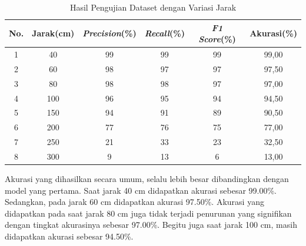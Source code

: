 
\begin{longtable}{|c|c|c|c|c|c|}
  \caption{Hasil Pengujian Dataset dengan Variasi Jarak}
  \label{tb:Hasil Pengujian Dataset dengan Variasi Jarak}\\
  \hline
  \textbf{No.} & \textbf{Jarak(cm)} & \textbf{\emph{Precision}(\%)} & \textbf{\emph{Recall}(\%)} & \textbf{\emph{F1 Score}(\%)} & \textbf{Akurasi(\%)} \\
  \hline
  1 & 40  & 99 & 99 & 99 & 99,00  \\
  2 & 60  & 98 & 97 & 97 & 97,50  \\
  3 & 80  & 98 & 98 & 97 & 97,00  \\
  4 & 100 & 96 & 95 & 94 & 94,50  \\
  5 & 150 & 94 & 91 & 89 & 90,50  \\
  6 & 200 & 77 & 76 & 75 & 77,00  \\
  7 & 250 & 21 & 33 & 23 & 32,50  \\
  8 & 300 & 9 & 13 & 6 & 13,00  \\
  \hline
\end{longtable}

Akurasi yang dihasilkan secara umum, selalu lebih besar dibandingkan dengan model yang pertama. Saat jarak 40 cm didapatkan akurasi sebesar 99.00\%. Sedangkan, pada jarak 60 cm didapatkan akurasi 97.50\%. Akurasi yang didapatkan pada saat jarak 80 cm juga tidak terjadi penurunan yang signifikan dengan tingkat akurasinya sebesar 97.00\%. Begitu juga saat jarak 100 cm, masih didapatkan akurasi sebesar 94.50\%.   

